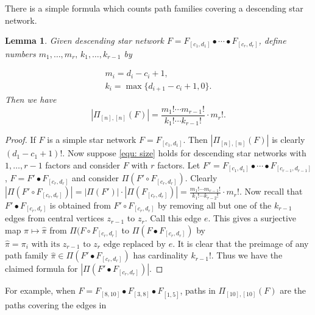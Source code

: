 \documentclass[12pt]{amsart}
\newtheorem{lem}[thm]{Lemma}
\theoremstyle{definition}
\numberwithin{equation}{section}
\begin{document}
There is a simple formula which counts path families covering a descending star network.

\begin{lem}\label{eq:counting number of path families}
Given descending star network $F = F_{[c_1,d_1]} \bullet \cdots \bullet F_{[c_r,d_r]}$, define numbers $m_1, \dotsc, m_r, \, k_1,\dotsc, k_{r-1}$ by

\begin{equation}\label{equ: size of stars}
    \begin{gathered}
        m_i=d_i-c_i+1, \qquad \qquad \;\\
        k_i=\max\{d_{i+1}-c_i+1,0\}.
    \end{gathered}
\end{equation}
Then we have
\begin{equation}\label{equ: size}
    |\Pi_{[n],[n]}(F)| = \frac{m_1 !\cdots m_{r-1} !}{  k_{1} !\cdots k_{r-1}!} \cdot m_r!.
\end{equation}
\end{lem}

\begin{proof}
If $F$ is a simple star network $F=F_{[c_1, d_1]}$. Then $|\Pi_{[n],[n]}(F)|$ is clearly $(d_1-c_1+1)!$. Now suppose \eqref{equ: size} holds for descending star networks with $1, \ldots, r-1$ factors and consider $F$ with $r$ factors. Let $F'=F_{[c_1,d_1]} \bullet \cdots \bullet F_{[c_{r-1},d_{r-1}]}$, $F=F'\bullet F_{[c_r, d_r]}$ and consider $\Pi(F'\circ F_{[c_r, d_r]})$. Clearly $|\Pi(F'\circ F_{[c_r, d_r]})|=|\Pi(F')|\cdot |\Pi(F_{[c_r,d_r]})|=\frac{m_1!\cdots m_{r-1}!}{k_1 !\cdots k_{r-2} !}\cdot m_r!$. Now recall that $F'\bullet F_{[c_r, d_r]}$ is obtained from $F'\circ F_{[c_r, d_r]}$ by removing all but one of the $k_{r-1}$ edges from central vertices $z_{r-1}$ to $z_r$. Call this edge $e$. This gives a surjective map $\pi\mapsto \widehat{\pi}$ from $\Pi(F\circ F_{[c_r, d_r]}$ to $\Pi(F\bullet F_{[c_r, d_r]})$ by $\widehat{\pi}=\pi_i \text{ with its $z_{r-1}$ to $z_r$ edge replaced by $e$}$. It is clear that the preimage of any path family $\widehat{\pi}\in\Pi(F'\bullet F_{[c_r, d_r]})$ has cardinality $k_{r-1}!$. Thus we have the claimed formula for $|\Pi(F'\bullet F_{[c_r, d_r]})|$.   %
\end{proof}

For example, when $F=F_{[8,10]}\bullet F_{[3,8]}\bullet F_{[1,5]}$, paths in $\Pi_{[10],[10]}(F)$ are the paths covering the edges in
\end{document}
